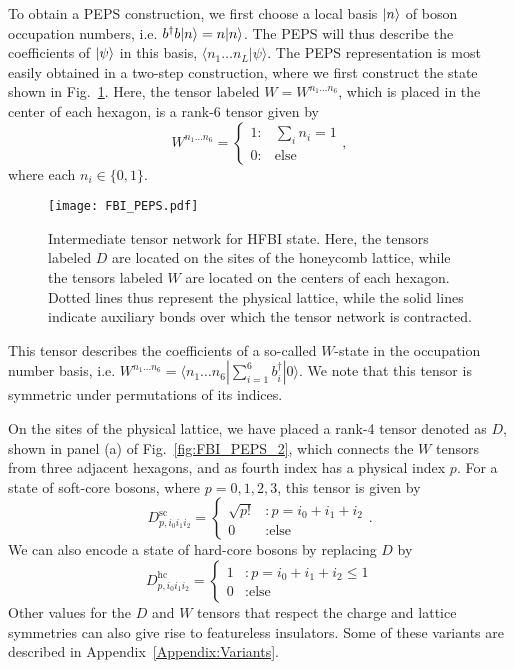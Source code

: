 To obtain a PEPS construction, we first choose a local basis $\vert n \rangle$
of boson occupation numbers, i.e. $b^\dagger b \vert n \rangle = n \vert n \rangle$.
The PEPS will thus describe the coefficients of $\vert \psi \rangle$ in this
basis, $\langle n_1 \ldots n_L | \psi \rangle$. The PEPS
representation is most easily obtained in a two-step construction,
where we first construct the state shown in Fig.~\ref{fig:FBI_PEPS}.
Here, the tensor labeled $W=W^{n_1 \ldots n_6}$, which is placed in
the center of each hexagon, is a rank-6 tensor given by
\begin{equation}
W^{n_1 \ldots n_6}  = \left\{ \begin{array}{lr}
													1  : & \sum\limits_i n_i = 1 \\
													0  : & \text{else}
													\end{array} \right.,
\end{equation}
where each $n_i \in \{0, 1\}$.

\begin{figure}
	\centering
	\texttt{[image: FBI\_PEPS.pdf]}
	\caption{
	Intermediate tensor network for HFBI state. Here, the tensors labeled
	$D$ are located on the sites of the honeycomb lattice, while the
	tensors labeled $W$ are located on the centers of each hexagon.
	Dotted lines thus represent the physical lattice, while the solid
	lines indicate auxiliary bonds over which the tensor network is
	contracted.}
	\label{fig:FBI_PEPS}
\end{figure}

This tensor describes the coefficients of a so-called $W$-state in the
occupation number basis, i.e. $W^{n_1 \ldots n_6}= \langle n_1
\ldots n_6 | \sum_{i=1}^6 b_i^\dagger |0\rangle$. We note that this
tensor is symmetric under permutations of its indices.

On the sites of the physical lattice, we have placed a rank-4 tensor
denoted as $D$, shown in panel (a) of Fig.~\ref{fig:FBI_PEPS_2}, which
connects the $W$ tensors from three adjacent hexagons, and as fourth
index has a physical index $p$. For a state of soft-core bosons, where
$p=0,1,2,3$, this tensor is given by
\begin{equation} \label{eqn:D}
D^\mathrm{sc}_{p, i_0 i_1 i_2}  = \left\{ \begin{array}{ll}
													\sqrt{p!}  &: p =i_0+i_1+i_2  \\
													0  &:  \text{else}
													\end{array}
											\right. .
\end{equation}
We can also encode a state of hard-core bosons by replacing $D$ by
\begin{equation}
D^\mathrm{hc}_{p, i_0 i_1 i_2}  = \left\{ \begin{array}{ll}
													1  &: p = i_0+i_1+i_2 \le 1  \\
													0  &:  \text{else}
													\end{array}
											\right.
\end{equation}
Other values for the $D$ and $W$ tensors that respect the charge and lattice symmetries
can also give rise to featureless insulators. 
Some of these variants are described in Appendix~\ref{Appendix:Variants}.

